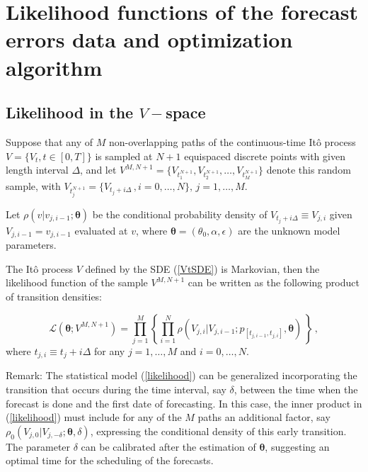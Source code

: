 \documentclass[11pt]{article}
\theoremstyle{definition}
\begin{document}


\section{ Likelihood functions of the forecast errors data and optimization algorithm} \label{Section_5} 

\subsection{Likelihood in the $V-$space}

Suppose that any of $M$ non-overlapping paths of the continuous-time It\^{o} process $V = \{ V_t, t  \in [0,T] \}$ is sampled at $N + 1$ equispaced discrete points with given length interval $\Delta$, and let $ V^{M,N + 1}=\{ V_{t_1^{N + 1}} , V_{t_2^{N + 1}} ,\ldots , V_{t_M^{N + 1}} \}$ denote this random sample, with $V_{t_j^{N + 1}} = \{ V_{t_j + i \Delta}\,, i = 0, \ldots, N \}, \, j = 1, \ldots, M$. 

Let $\rho(v \vert v_{j, i-1} ; \bm{\theta})$ be the conditional probability density of $V_{t_j + i \Delta} \equiv V_{j, i}$ given $V_{j, i-1} = v_{j, i-1}$ evaluated at $v$, where $\bm{\theta} = (\theta_0, \alpha, \epsilon)$ are the unknown model parameters.

The It\^{o} process $V$ defined by the SDE (\ref{VtSDE}) is Markovian, then the likelihood function of the sample $ V^{M,N + 1}$ can be written as the following product of transition densities:  

\begin{equation}
\mathcal{L}(\bm{\theta}; V^{M,N +1}) = \prod\limits_{j=1}^M \left\{ \prod\limits_{i=1}^N \rho ( {V_{j, i}| V_{j, i-1}} ; p_{[t_{j,  i-1}, t_{j , i} ]},  \bm{\theta} )  \,  \right\} \,,
\label{likelihood}
\end{equation}
where $t_{j ,i} \equiv  t_j + i \Delta$ for any $j = 1, \ldots, M$ and $i = 0, \ldots, N$.

 {\color{red} Remark: The statistical model (\ref{likelihood}) can be generalized incorporating the transition that occurs during the time interval, say $\delta$, between the time when the forecast is done and the first date of forecasting. In this case, the inner product in  (\ref{likelihood}) must include for any of the $M$ paths an additional factor, say $\rho_0 (V_{j, 0}|V_{j, -\delta};\bm{\theta},\delta)$, expressing the conditional density of this early transition. The parameter $\delta$ can be calibrated after the estimation of $\bm{\theta}$, suggesting an optimal time for the scheduling of the forecasts.}
\end{document}
